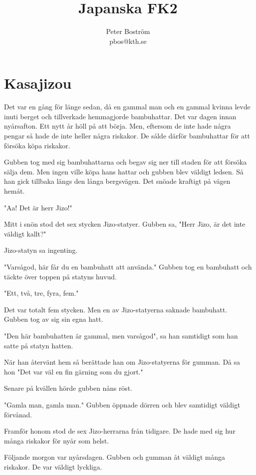\documentclass[a4paper] {article}
\title {Japanska FK2}
\author {Peter Boström \\ pbos@kth.se}
\begin{document}
\maketitle

\section*{Kasajizou}

Det var en gång för länge sedan, då en gammal man och en gammal kvinna levde inuti berget och tillverkade hemmagjorde bambuhattar. Det var dagen innan nyårsafton. Ett nytt år höll på att börja. Men, eftersom de inte hade några pengar så hade de inte heller några riskakor. De sålde därför bambuhattar för att försöka köpa riskakor.

Gubben tog med sig bambuhattarna och begav sig ner till staden för att försöka sälja dem. Men ingen ville köpa hans hattar och gubben blev väldigt ledsen. Så han gick tillbaka längs den långa bergsvägen. Det snöade kraftigt på vägen hemåt.

"Aa! Det är herr Jizo!"

Mitt i snön stod det sex stycken Jizo-statyer. Gubben sa, "Herr Jizo, är det inte väldigt kallt?"

Jizo-statyn sa ingenting.

"Varsågod, här får du en bambuhatt att använda." Gubben tog en bambuhatt och täckte över toppen på statyns huvud.

"Ett, två, tre, fyra, fem."

Det var totalt fem stycken. Men en av Jizo-statyerna saknade bambuhatt. Gubben tog av sig sin egna hatt.

"Den här bambuhatten är gammal, men varsågod", sa han samtidigt som han satte på statyn hatten.

När han återvänt hem så berättade han om Jizo-statyerna för gumman. Då sa hon "Det var väl en fin gärning som du gjort."

Senare på kvällen hörde gubben nåns röst.

"Gamla man, gamla man." Gubben öppnade dörren och blev samtidigt väldigt förvånad.

Framför honom stod de sex Jizo-herrarna från tidigare. De hade med sig hur många riskakor för nyår som helst.

Följande morgon var nyårsdagen. Gubben och gumman åt väldigt många riskakor. De var väldigt lyckliga.
\end{document}
